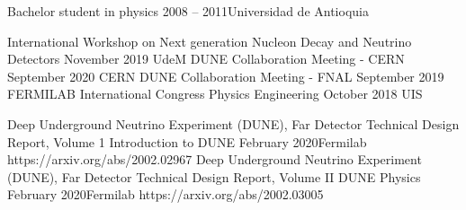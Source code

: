 
\cvevent{} {Bachelor student in physics}
{2008 -- 2011}{Universidad de Antioquia}

\cvevent{} {International Workshop on
Next generation Nucleon
Decay and Neutrino Detectors}
{November 2019 }{UdeM}
\cvevent{} {DUNE Collaboration Meeting - CERN}
{September 2020 }{CERN}
\cvevent{} {DUNE Collaboration Meeting - FNAL}
{September 2019 }{FERMILAB}
\cvevent{} {International Congress Physics Engineering}
{October 2018 }{UIS}


\cvevent{} {Deep Underground Neutrino Experiment (DUNE), Far Detector Technical Design Report, Volume 1 Introduction to DUNE}
{February 2020}{Fermilab}
https://arxiv.org/abs/2002.02967
\cvevent{} {Deep Underground Neutrino Experiment (DUNE), Far Detector Technical Design Report, Volume II DUNE Physics}
{February 2020}{Fermilab}
https://arxiv.org/abs/2002.03005








